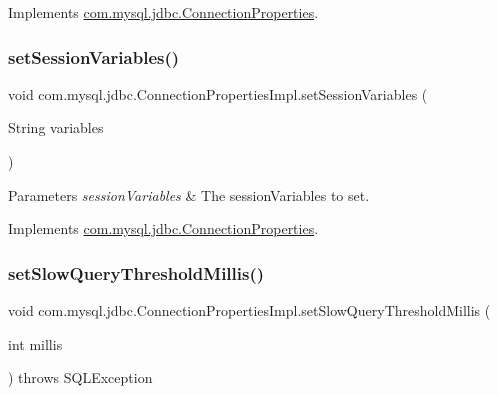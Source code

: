 Implements \mbox{\hyperlink{interfacecom_1_1mysql_1_1jdbc_1_1_connection_properties_a696230dd8e57568c8742fffecb1040aa}{com.\+mysql.\+jdbc.\+Connection\+Properties}}.

\mbox{\label{classcom_1_1mysql_1_1jdbc_1_1_connection_properties_impl_ab45209f886ce9eaa0ad7134674db924e}} 
\subsubsection{\texorpdfstring{set\+Session\+Variables()}{setSessionVariables()}}
{\footnotesize\ttfamily void com.\+mysql.\+jdbc.\+Connection\+Properties\+Impl.\+set\+Session\+Variables (\begin{DoxyParamCaption}\item[{String}]{variables }\end{DoxyParamCaption})}


\begin{DoxyParams}{Parameters}
{\em session\+Variables} & The session\+Variables to set. \\
\hline
\end{DoxyParams}


Implements \mbox{\hyperlink{interfacecom_1_1mysql_1_1jdbc_1_1_connection_properties_a9883494dfd2b4b2ed6905ecc13cc167d}{com.\+mysql.\+jdbc.\+Connection\+Properties}}.

\mbox{\label{classcom_1_1mysql_1_1jdbc_1_1_connection_properties_impl_a32694f0aad4b653be6c209d729576e60}} 
\subsubsection{\texorpdfstring{set\+Slow\+Query\+Threshold\+Millis()}{setSlowQueryThresholdMillis()}}
{\footnotesize\ttfamily void com.\+mysql.\+jdbc.\+Connection\+Properties\+Impl.\+set\+Slow\+Query\+Threshold\+Millis (\begin{DoxyParamCaption}\item[{int}]{millis }\end{DoxyParamCaption}) throws S\+Q\+L\+Exception}


